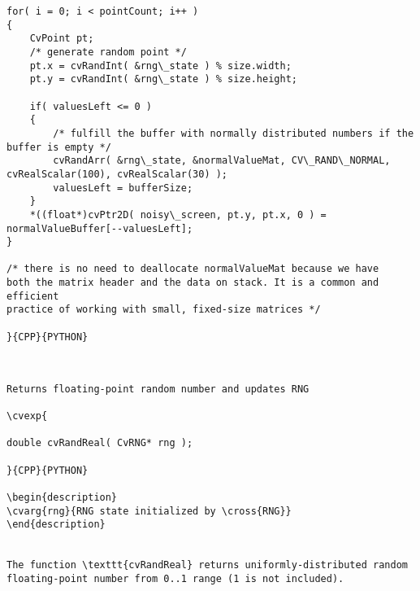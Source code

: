 \begin{verbatim}
for( i = 0; i < pointCount; i++ )
{
    CvPoint pt;
    /* generate random point */
    pt.x = cvRandInt( &rng\_state ) % size.width;
    pt.y = cvRandInt( &rng\_state ) % size.height;

    if( valuesLeft <= 0 )
    {
        /* fulfill the buffer with normally distributed numbers if the buffer is empty */
        cvRandArr( &rng\_state, &normalValueMat, CV\_RAND\_NORMAL, cvRealScalar(100), cvRealScalar(30) );
        valuesLeft = bufferSize;
    }
    *((float*)cvPtr2D( noisy\_screen, pt.y, pt.x, 0 ) = normalValueBuffer[--valuesLeft];
}

/* there is no need to deallocate normalValueMat because we have
both the matrix header and the data on stack. It is a common and efficient
practice of working with small, fixed-size matrices */

}{CPP}{PYTHON}


\end{verbatim}
\begin{verbatim}

Returns floating-point random number and updates RNG

\cvexp{

double cvRandReal( CvRNG* rng );

}{CPP}{PYTHON}

\begin{description}
\cvarg{rng}{RNG state initialized by \cross{RNG}}
\end{description}


The function \texttt{cvRandReal} returns uniformly-distributed random floating-point number from 0..1 range (1 is not included).


\end{verbatim}
